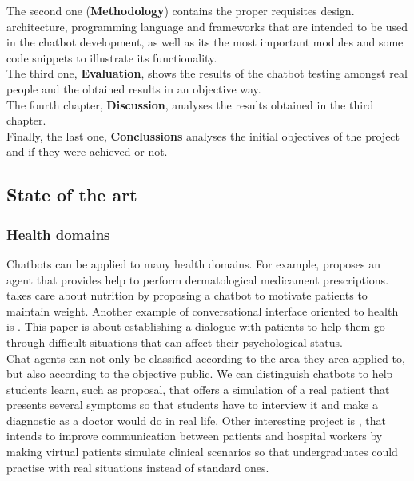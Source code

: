 \documentclass[12pt,english]{article}
\begin{document}
The second one (\textbf{Methodology}) contains the proper requisites design. architecture, programming language and frameworks that are intended to be used in the chatbot development, as well as its the most important modules and some code snippets to illustrate its functionality.\\

The third one, \textbf{Evaluation}, shows the results of the chatbot testing amongst real people and the obtained results in an objective way.\\

The fourth chapter, \textbf{Discussion}, analyses the results obtained in the third chapter.\\

Finally, the last one, \textbf{Conclussions} analyses the initial objectives of the project and if they were achieved or not.



\newpage

\subsection{State of the art}

\subsubsection{Health domains}

Chatbots can be applied to many health domains. For example, \cite{Alesanco2017185} proposes an agent that provides help to perform dermatological medicament prescriptions. \cite{BennetPraba20193470} takes care about nutrition by proposing a chatbot to motivate patients to maintain weight. Another example of conversational interface oriented to health is \cite{Falala-Sechet2019236}. This paper is about establishing a dialogue with patients to help them go through difficult situations that can affect their psychological status.\\

Chat agents can not only be classified according to the area they area applied to, but also according to the objective public. We can distinguish chatbots to help students learn, such as \cite{Lopez2008194} proposal, that offers a simulation of a real patient that presents several symptoms so that students have to interview it and make a diagnostic as a doctor would do in real life. Other interesting project is \cite{Shorey2019e14658}, that intends to improve communication between patients and hospital workers by making virtual patients simulate clinical scenarios so that undergraduates could practise with real situations instead of standard ones.\\
\end{document}
